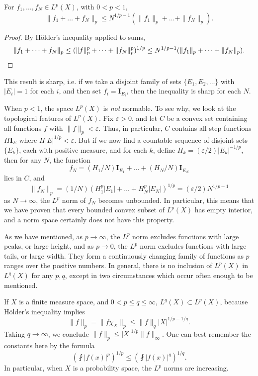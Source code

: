 \begin{theorem} \label{quasitriangleinequalitylp}
    For $f_1, \dots, f_N \in L^p(X)$, with $0 < p < 1$,
    \[ \| f_1 + \dots + f_N \|_p \leq N^{1/p - 1} (\| f_1 \|_p + \dots + \| f_N \|_p). \]
\end{theorem}
\begin{proof}
    By H\"{o}lder's inequality applied to sums,
    \[ \| f_1 + \dots + f_N \|_p \leq (\| f \|_p^p + \dots + \| f_N \|_p^p)^{1/p} \leq N^{1/p - 1} (\| f_1 \|_p + \dots + \| f_N \|_p). \qedhere \]
\end{proof}

This result is sharp, i.e. if we take a disjoint family of sets $\{ E_1, E_2, \dots \}$ with $|E_i| = 1$ for each $i$, and then set $f_i = \mathbf{I}_{E_i}$, then the inequality is sharp for each $N$.

\begin{remark}
    When $p < 1$, the space $L^p(X)$ is \emph{not} normable. To see why, we look at the topological features of $L^p(X)$. Fix $\varepsilon > 0$, and let $C$ be a convex set containing all functions $f$ with $\| f \|_p < \varepsilon$. Thus, in particular, $C$ contains all step functions $H \mathbf{I}_E$ where $H |E|^{1/p} < \varepsilon$. But if we now find a countable sequence of disjoint sets $\{ E_k \}$, each with positive measure, and for each $k$, define $H_k = (\varepsilon/2) |E_k|^{-1/p}$, then for any $N$, the function
    \[ f_N = (H_1/N) \mathbf{I}_{E_1} + \dots + (H_N/N) \mathbf{I}_{E_N} \]
    lies in $C$, and
    \[ \| f_N \|_p = (1/N) (H_1^p |E_1| + \dots + H_N^p |E_N|)^{1/p} = (\varepsilon/2) N^{1/p - 1} \]
    as $N \to \infty$, the $L^p$ norm of $f_N$ becomes unbounded. In particular, this means that we have proven that every bounded convex subset of $L^p(X)$ has empty interior, and a norm space certainly does not have this property.
\end{remark}

As we have mentioned, as $p \to \infty$, the $L^p$ norm excludes functions with large peaks, or large height, and as $p \to 0$, the $L^p$ norm excludes functions with large tails, or large width. They form a continuously changing family of functions as $p$ ranges over the positive numbers. In general, there is no inclusion of $L^p(X)$ in $L^q(X)$ for any $p,q$, except in two circumstances which occur often enough to be mentioned.

\begin{example}
  If $X$ is a finite measure space, and $0 < p \leq q \leq \infty$, $L^q(X) \subset L^p(X)$, because H\"{o}lder's inequality implies
  \[ \| f \|_p = \| f \chi_X \|_p \leq \| f \|_q |X|^{1/p-1/q}. \]
  Taking $q \to \infty$, we conclude $\| f \|_p \leq | X |^{1/p} \| f \|_\infty$. One can best remember the constants here by the formula
  \[ \left( \fint |f(x)|^p \right)^{1/p} \leq \left( \fint |f(x)|^q \right)^{1/q}. \]
  In particular, when $X$ is a probability space, the $L^p$ norms are increasing.
\end{example}

